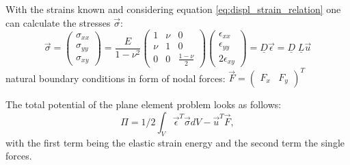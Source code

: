   With the strains known and considering equation \ref{eq:displ_strain_relation} one can calculate the stresses $\vec{\sigma}$:
  \begin{equation}\label{eq:sigma=D*eps}
  \vec{\sigma} = \begin{pmatrix}
  \sigma_{xx} \\
  \sigma_{yy} \\
  \sigma_{xy}
  \end{pmatrix} = \frac{E}{1-\nu^2} \begin{pmatrix}
  1 & \nu & 0 \\
  \nu & 1 & 0 \\
  0 & 0 & \frac{1-\nu}{2}
  \end{pmatrix} \begin{pmatrix}
  \epsilon_{xx} \\
  \epsilon_{yy} \\
  2\epsilon_{xy}
  \end{pmatrix} = \underline{D} \vec{\epsilon} = \underline{D}\; \underline{L} \vec{u}
  \end{equation}
  natural boundary conditions in form of nodal forces: $\vec{F} = \begin{pmatrix}
  F_x & F_y
  \end{pmatrix}^T$
  
  The total potential of the plane element problem looks as follows:
  \begin{equation}\label{eq:planeFunctional}
  \Pi = 1/2 \int_{V}\vec{\epsilon}^T\vec{\sigma}dV - \vec{u}^T \vec{F},
  \end{equation}
  with the first term being the elastic strain energy and the second term the single forces.
  
